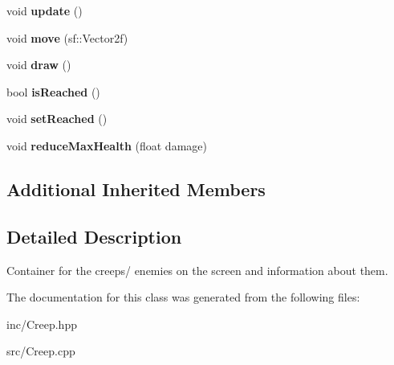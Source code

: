 \begin{DoxyCompactItemize}
\item 
\hypertarget{class_creep_af0f29d839aba4fcc37a1d4cfc404e63e}{void {\bfseries update} ()}\label{class_creep_af0f29d839aba4fcc37a1d4cfc404e63e}

\item 
\hypertarget{class_creep_abd262431d4378c58d8230843af4f7ceb}{void {\bfseries move} (sf\+::\+Vector2f)}\label{class_creep_abd262431d4378c58d8230843af4f7ceb}

\item 
\hypertarget{class_creep_a6c24639cf96acfc7f50b5899e00d65f4}{void {\bfseries draw} ()}\label{class_creep_a6c24639cf96acfc7f50b5899e00d65f4}

\item 
\hypertarget{class_creep_a5a9a881507ee18469f9d1df7a72ad5b9}{bool {\bfseries is\+Reached} ()}\label{class_creep_a5a9a881507ee18469f9d1df7a72ad5b9}

\item 
\hypertarget{class_creep_aa415eb0c0eb2de3114d5e4dd75ec299a}{void {\bfseries set\+Reached} ()}\label{class_creep_aa415eb0c0eb2de3114d5e4dd75ec299a}

\item 
\hypertarget{class_creep_ac416ef97932f22b8e9c021b8619770db}{void {\bfseries reduce\+Max\+Health} (float damage)}\label{class_creep_ac416ef97932f22b8e9c021b8619770db}

\end{DoxyCompactItemize}
\subsection*{Additional Inherited Members}


\subsection{Detailed Description}
Container for the creeps/ enemies on the screen and information about them. 

The documentation for this class was generated from the following files\+:\begin{DoxyCompactItemize}
\item 
inc/Creep.\+hpp\item 
src/Creep.\+cpp\end{DoxyCompactItemize}
